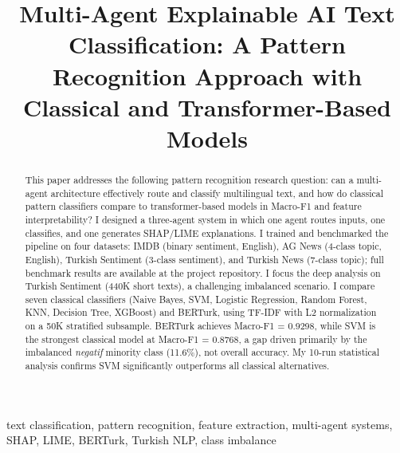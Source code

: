 \documentclass[conference]{IEEEtran}
\begin{document}
\title{Multi-Agent Explainable AI Text Classification: A Pattern Recognition Approach
	with Classical and Transformer-Based Models\\
}

\author{
}

\maketitle

\begin{abstract}
This paper addresses the following pattern recognition research question: can a
multi-agent architecture effectively route and classify multilingual text, and how do
classical pattern classifiers compare to transformer-based models in Macro-F1
and feature interpretability? I designed a three-agent system in which one agent routes
inputs, one classifies, and one generates SHAP/LIME explanations. I trained and
benchmarked the pipeline on four datasets: IMDB (binary sentiment, English), AG News
(4-class topic, English), Turkish Sentiment (3-class sentiment), and Turkish News
(7-class topic); full benchmark results are available at the project repository. I focus
the deep analysis on Turkish Sentiment (440K short texts), a challenging imbalanced
scenario. I compare seven classical classifiers (Naive Bayes, SVM, Logistic Regression,
Random Forest, KNN, Decision Tree, XGBoost) and BERTurk, using TF-IDF with L2
normalization on a 50K stratified subsample. BERTurk achieves Macro-F1 = 0.9298, while
SVM is the strongest classical model at Macro-F1 = 0.8768, a gap driven primarily by
the imbalanced \textit{negatif} minority class (11.6\%), not overall accuracy. My
10-run statistical analysis confirms SVM significantly outperforms all classical
alternatives.
\end{abstract}

\begin{IEEEkeywords}
text classification, pattern recognition, feature extraction, multi-agent systems,
SHAP, LIME, BERTurk, Turkish NLP, class imbalance
\end{IEEEkeywords}

\end{document}
